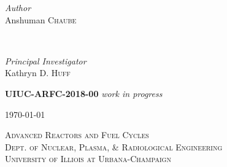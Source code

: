 \documentclass[14pt,a4paper]{article} %
\begin{document}
\begin{titlepage}
    \begin{minipage}{0.4\textwidth}
        \begin{flushleft}
            \large
            \textit{Author}\\
            Anshuman \textsc{Chaube}\\
        \end{flushleft}
    \end{minipage}
    ~
    \begin{minipage}{0.4\textwidth}
        \begin{flushright}
            \large
            \textit{Principal Investigator}\\
            Kathryn D. \textsc{Huff} %
        \end{flushright}
    \end{minipage}
    

    \vspace{1cm}
    \textsc{\LARGE\bfseries UIUC-ARFC-2018-00} \textit{work in progress} %
    \vspace{0.5cm}
    
    
    \vspace{0.5cm} %
    {\large\today} %
    \vspace{0.5cm}

    
    \textsc{\LARGE Advanced Reactors and Fuel Cycles}\\[0.25cm] %
    
    \textsc{\large Dept. of Nuclear, Plasma, \& Radiological Engineering}\\%
    
    \textsc{\large University of Illiois at Urbana-Champaign}\\ %



\end{titlepage}
\end{document}
